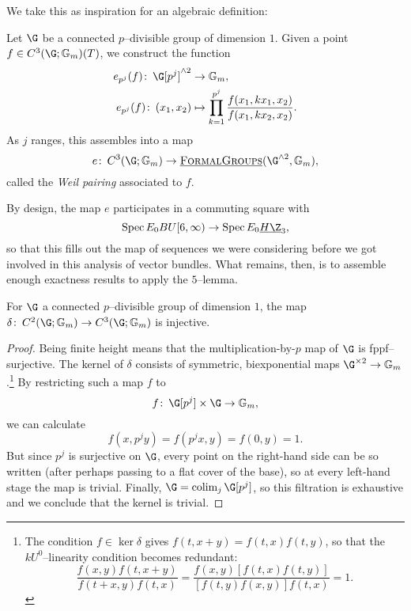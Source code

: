 We take this as inspiration for an algebraic definition:

\begin{definition}
Let \(\G\) be a connected \(p\)--divisible group of dimension \(1\).  Given a point \(f \in C^3(\G; \Gm)(T)\), we construct the function
\begin{align*}
e_{p^j}(f)\co \G[p^j]^{\sm 2} & \to \Gm, \\
e_{p^j}(f)\co (x_1, x_2) & \mapsto \prod_{k=1}^{p^j} \frac{f(x_1, kx_1, x_2)}{f(x_1, kx_2, x_2)}.
\end{align*}
As \(j\) ranges, this assembles into a map \[e\co C^3(\G; \Gm) \to \InternalHom{FormalGroups}(\G^{\sm 2}, \Gm),\] called the \textit{Weil pairing} associated to \(f\).
\end{definition}

By design, the map \(e\) participates in a commuting square with \[\Spec E_0 BU[6, \infty) \to \Spec E_0 \OS{H\Z}{3},\] so that this fills out the map of sequences we were considering before we got involved in this analysis of vector bundles.  What remains, then, is to assemble enough exactness results to apply the \(5\)--lemma.

\begin{lemma}
For \(\G\) a connected \(p\)--divisible group of dimension \(1\), the map \(\delta\co C^2(\G; \Gm) \to C^3(\G; \Gm)\) is injective.
\end{lemma}
\begin{proof}
Being finite height means that the multiplication-by-\(p\) map of \(\G\) is fppf--surjective.  The kernel of \(\delta\) consists of symmetric, biexponential maps \(\G^{\times 2} \to \Gm\).\footnote{The condition \(f \in \ker \delta\) gives \(f(t, x+y) = f(t, x) f(t, y)\), so that the \(kU^0\)--linearity condition becomes redundant: \[\frac{f(x, y) f(t, x+y)}{f(t+x, y) f(t, x)} = \frac{f(x, y) [f(t, x) f(t, y)]}{[f(t, y) f(x, y)] f(t, x)} = 1.\]}  By restricting such a map \(f\) to \[f \co \G[p^j] \times \G \to \Gm,\] we can calculate \[f(x, p^j y) = f(p^j x, y) = f(0, y) = 1.\]  But since \(p^j\) is surjective on \(\G\), every point on the right-hand side can be so written (after perhaps passing to a flat cover of the base), so at every left-hand stage the map is trivial.  Finally, \(\G = \colim_j \G[p^j]\), so this filtration is exhaustive and we conclude that the kernel is trivial.
\end{proof}

